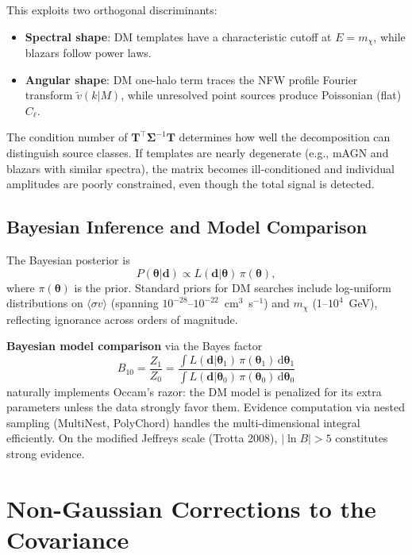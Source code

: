 \documentclass[10pt,a4paper]{article}
\newcommand{\Cl}{C_\ell}
\newcommand{\sigmav}{\langle\sigma v\rangle}
\newcommand{\mchi}{m_\chi}
\newcommand{\vtilde}{\tilde{v}}
\begin{document}
This exploits two orthogonal discriminants:
\begin{itemize}[leftmargin=2em]
\item \textbf{Spectral shape}: DM templates have a characteristic cutoff at $E = \mchi$, while blazars follow power laws.
\item \textbf{Angular shape}: DM one-halo term traces the NFW profile Fourier transform $\vtilde(k|M)$, while unresolved point sources produce Poissonian (flat) $\Cl$.
\end{itemize}

The condition number of $\mathbf{T}^\top \bm{\Sigma}^{-1} \mathbf{T}$ determines how well the decomposition can distinguish source classes. If templates are nearly degenerate (e.g., mAGN and blazars with similar spectra), the matrix becomes ill-conditioned and individual amplitudes are poorly constrained, even though the total signal is detected.


\subsection{Bayesian Inference and Model Comparison}

The Bayesian posterior is
\begin{equation}
P(\bm{\theta}|\mathbf{d}) \propto L(\mathbf{d}|\bm{\theta})\, \pi(\bm{\theta}),
\end{equation}
where $\pi(\bm{\theta})$ is the prior. Standard priors for DM searches include log-uniform distributions on $\sigmav$ (spanning $10^{-28}$--$10^{-22}$~cm$^3$~s$^{-1}$) and $\mchi$ (1--$10^4$~GeV), reflecting ignorance across orders of magnitude.

\textbf{Bayesian model comparison} via the Bayes factor
\begin{equation}
B_{10} = \frac{Z_1}{Z_0}
= \frac{\int L(\mathbf{d}|\bm{\theta}_1)\, \pi(\bm{\theta}_1)\, \mathrm{d}\bm{\theta}_1}
{\int L(\mathbf{d}|\bm{\theta}_0)\, \pi(\bm{\theta}_0)\, \mathrm{d}\bm{\theta}_0}
\end{equation}
naturally implements Occam's razor: the DM model is penalized for its extra parameters unless the data strongly favor them. Evidence computation via nested sampling (MultiNest, PolyChord) handles the multi-dimensional integral efficiently. On the modified Jeffreys scale (Trotta 2008), $|\ln B| > 5$ constitutes strong evidence.


\section{Non-Gaussian Corrections to the Covariance}
\label{sec:nongaussian}
\end{document}
